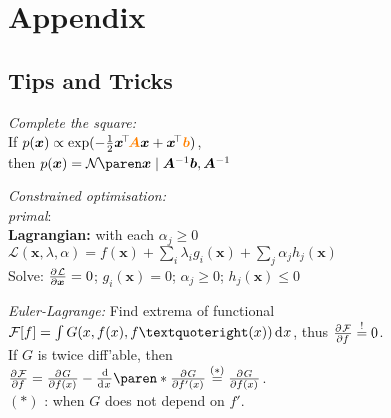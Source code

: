 \section{Appendix}

\subsection{Tips and Tricks}

\emph{Complete the square:}
\\
If $p(\bm x) \propto \exp(-\frac12 \bm x\!^\top \!\bm{{\color{orange} A}x} + \bm x\!^\top {\color{orange} \bm b})$,\\
then $p(\bm x) = \Gauss{\bm x \mid \bm A^{-1} \bm b, \bm A^{-1}}$

\emph{Constrained optimisation:}
\\
\textit{primal}: \enspace {}
\\
\textbf{Lagrangian:} \enspace with each $\alpha_j \geq 0$\\
\enspace $\mathcal L(\bm x,\lambda,\alpha) = f(\bm x) + \sum_i \lambda_i g_i(\bm x) + \sum_j \alpha_j h_j(\bm x)$
\\
Solve: \: $\pderiv{\mathcal L}{\bm x} = 0$; \: $g_i(\bm x) = 0$; \: $\alpha_j \geq 0$; \: $h_j(\bm x) \leq 0$
\iffalse
    \emph{Lagrange Multipliers:}
    \\
    Problem $\mathcal P : \begin{cases}
        \min f(\bm x),      & \bm x\in\mathbb R^d \\
        \text{s.t. } g_i(\bm x)=0,      & i\leq m \\
        \phantom{\text{s.t. }} h_j(\bm x) \leq 0,       & j\leq n
    \end{cases}$
    \\
    Lagrangian: $\mathcal L(\bm x,\lambda,\alpha) = f(\bm x) + \sum_{i\leq m} \lambda_i g_i(\bm x) + \sum_{j\leq n} \alpha_j h_j(\bm x)$ with each $\alpha_j \geq 0$.
    \\
    Solution must satisfy
    $\pderiv{\mathcal L}{\bm x} = 0$ and $\pderiv{\mathcal L}{\lambda} = 0$,
    $\alpha_j h_j(\bm x) = 0$, and
    $\alpha_j \geq 0, \forall j\leq n$.
\fi

\emph{Euler-Lagrange:}
Find extrema of functional $\mathcal F[f] = \int G(x, f(x), f’(x)) \diff x$,
thus $\pderiv{\mathcal F}{f} \overset!= 0$.
\\
If $G$ is twice diff'able, then
\\
$\pderiv{\mathcal F}{f} = \pderiv{G}{f(x)} - \deriv{}{x} \paren*{ \pderiv{G}{f'(x)} } \overset{(\ast)}= \pderiv{G}{f(x)}$.
\\
$(\ast)$ : when $G$ does not depend on $f'$.



